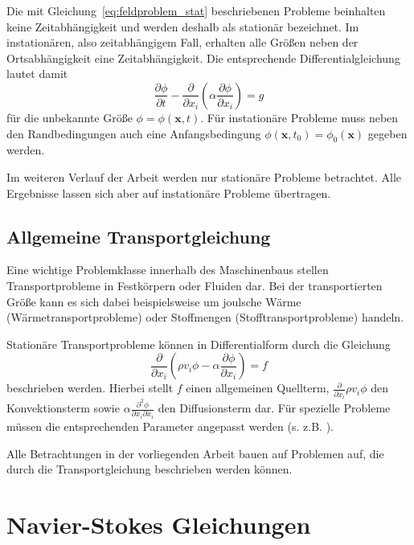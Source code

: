 Die mit Gleichung~\eqref{eq:feldproblem_stat} beschriebenen Probleme beinhalten keine Zeitabhängigkeit
und werden deshalb als stationär bezeichnet.
Im instationären, also zeitabhängigem Fall, erhalten alle Größen neben der Ortsabhängigkeit
eine Zeitabhängigkeit. Die entsprechende Differentialgleichung lautet damit
\begin{equation}
  \frac{\partial \phi}{\partial t}
  -\frac{\partial}{\partial x_i}\left({\alpha \frac{\partial \phi}{\partial x_i} }\right)=g
  \label{eq:feldproblem_instat}
\end{equation}
für die unbekannte Größe $\phi=\phi(\mathbf{x}, t)$.
Für instationäre Probleme muss neben den Randbedingungen auch eine Anfangsbedingung
$\phi(\mathbf{x}, t_0) = \phi_0(\mathbf{x})$ gegeben werden.

Im weiteren Verlauf der Arbeit werden nur stationäre Probleme betrachtet. Alle Ergebnisse
lassen sich aber auf instationäre Probleme übertragen.

\subsection{Allgemeine Transportgleichung}
\label{sec:transportgl}

Eine wichtige Problemklasse innerhalb des Maschinenbaus stellen Transportprobleme in
Festkörpern oder Fluiden dar. Bei der transportierten Größe kann es sich dabei beispielsweise
um joulsche Wärme (Wärmetransportprobleme) oder Stoffmengen (Stofftransportprobleme) handeln.

Stationäre Transportprobleme können in Differentialform durch die Gleichung
\begin{equation}
  \frac{\partial}{\partial x_i} \left({\rho v_i \phi
- \alpha \frac{\partial \phi}{\partial x_i} }\right) = f
\label{eq:transportgl}
\end{equation}
beschrieben werden. Hierbei stellt $f$ einen allgemeinen Quellterm,
$\frac{\partial}{\partial x_i} \rho v_i \phi$ den Konvektionsterm sowie
$\alpha \frac{\partial^2 \phi}{\partial x_i \partial x_i}$ den Diffusionsterm dar.
Für spezielle Probleme müssen die entsprechenden Parameter angepasst werden (s. z.B. \cite{num_maschbau}).

Alle Betrachtungen in der vorliegenden Arbeit bauen auf Problemen auf, die durch die
Transportgleichung beschrieben werden können.

\section{Navier-Stokes Gleichungen}

